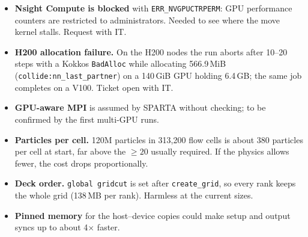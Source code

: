 \documentclass[11pt,a4paper]{article}
\newcommand{\code}[1]{\texttt{#1}}
\begin{document}
\begin{itemize}
  \item \textbf{Nsight Compute is blocked} with \code{ERR\_NVGPUCTRPERM}: GPU
        performance counters are restricted to administrators. Needed to see
        where the move kernel stalls. Request with IT.
  \item \textbf{H200 allocation failure.} On the H200 nodes the run aborts
        after 10--20 steps with a Kokkos \code{BadAlloc} while
        allocating 566.9\,MiB (\code{collide:nn\_last\_partner}) on a 140\,GiB
        GPU holding 6.4\,GB; the same job completes on a V100. Ticket open
        with IT.
  \item \textbf{GPU-aware MPI} is assumed by SPARTA without checking; to be
        confirmed by the first multi-GPU runs.
  \item \textbf{Particles per cell.} 120M particles in 313,200 flow cells is
        about 380 particles per cell at start, far above the $\geq 20$ usually
        required. If the physics allows fewer, the cost drops proportionally.
  \item \textbf{Deck order.} \code{global gridcut} is set after
        \code{create\_grid}, so every rank keeps the whole grid (138\,MB per
        rank). Harmless at the current sizes.
  \item \textbf{Pinned memory} for the host--device copies could make setup
        and output syncs up to about 4$\times$ faster.
\end{itemize}
\end{document}
